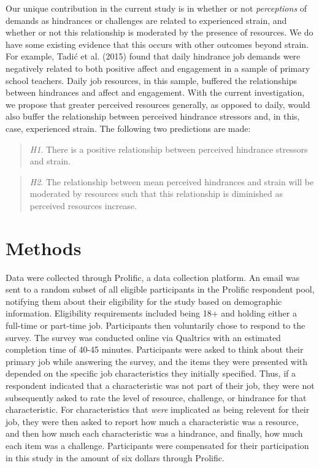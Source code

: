 \documentclass[
  english,
  man]{apa6}
\begin{document}
Our unique contribution in the current study is in whether or not \emph{perceptions} of demands as hindrances or challenges are related to experienced strain, and whether or not this relationship is moderated by the presence of resources. We do have some existing evidence that this occurs with other outcomes beyond strain. For example, Tadić et al. (2015) found that daily hindrance job demands were negatively related to both positive affect and engagement in a sample of primary school teachers. Daily job resources, in this sample, buffered the relationships between hindrances and affect and engagement. With the current investigation, we propose that greater perceived resources generally, as opposed to daily, would also buffer the relationship between perceived hindrance stressors and, in this, case, experienced strain. The following two predictions are made:

\begin{quote}
\emph{H1}. There is a positive relationship between perceived hindrance stressors and strain.
\end{quote}

\begin{quote}
\emph{H2}. The relationship between mean perceived hindrances and strain will be moderated by resources such that this relationship is diminished as perceived resources increase.
\end{quote}

\hypertarget{methods}{%
\section{Methods}\label{methods}}

Data were collected through Prolific, a data collection platform. An email was sent to a random subset of all eligible participants in the Prolific respondent pool, notifying them about their eligibility for the study based on demographic information. Eligibility requirements included being 18+ and holding either a full-time or part-time job. Participants then voluntarily chose to respond to the survey. The survey was conducted online via Qualtrics with an estimated completion time of 40-45 minutes. Participants were asked to think about their primary job while answering the survey, and the items they were presented with depended on the specific job characteristics they initially specified. Thus, if a respondent indicated that a characteristic was not part of their job, they were not subsequently asked to rate the level of resource, challenge, or hindrance for that characteristic. For characteristics that \emph{were} implicated as being relevent for their job, they were then asked to report how much a characteristic was a resource, and then how much each characteristic was a hindrance, and finally, how much each item was a challenge. Participants were compensated for their participation in this study in the amount of six dollars through Prolific.
\end{document}
